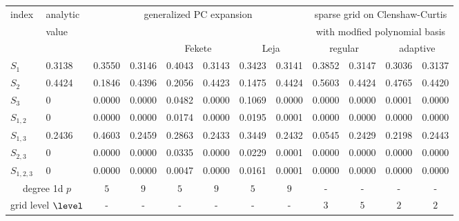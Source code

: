 
\begin{table}[!ht]
  \fontsize{8pt}{3ex}\selectfont
  \renewcommand{\arraystretch}{1.2}
  \begin{tabularx}{\textwidth}{XXXXXXXXXXXX}
    \toprule
    index &
    analytic &
    \multicolumn{6}{c}{generalized PC expansion} &
    \multicolumn{4}{c}{sparse grid on Clenshaw-Curtis} \\
    &
    value &
    & & & & & &
    \multicolumn{4}{c}{with modfied polynomial basis} \\
    \hline
    & &
    \multicolumn{2}{c}{\citet{Sudret08Global}} &
    \multicolumn{2}{c}{Fekete} &
    \multicolumn{2}{c}{Leja} &
    \multicolumn{2}{c}{regular} &
    \multicolumn{2}{c}{adaptive} \\
    \toprule
    $S_1$ & 0.3138 & 0.3550 & 0.3146 & 0.4043 & 0.3143 & 0.3423 & 0.3141 & 0.3852 & 0.3147 & 0.3036 & 0.3137 \\
    $S_2$ & 0.4424 & 0.1846 & 0.4396 & 0.2056 & 0.4423 & 0.1475 & 0.4424 & 0.5603 & 0.4424 & 0.4765 & 0.4420 \\
    $S_3$ & 0 & 0.0000 & 0.0000 & 0.0482 & 0.0000 & 0.1069 & 0.0000 & 0.0000 & 0.0000 & 0.0001 & 0.0000 \\
    $S_{1, 2}$ & 0 & 0.0000 & 0.0000 & 0.0174 & 0.0000 & 0.0195 & 0.0001 & 0.0000 & 0.0000 & 0.0000 & 0.0000 \\
    $S_{1, 3}$ & 0.2436 & 0.4603 & 0.2459 & 0.2863 & 0.2433 & 0.3449 & 0.2432 & 0.0545 & 0.2429 & 0.2198 & 0.2443 \\
    $S_{2, 3}$ & 0 & 0.0000 & 0.0000 & 0.0335 & 0.0000 & 0.0229 & 0.0001 & 0.0000 & 0.0000 & 0.0000 & 0.0000 \\
    $S_{1, 2, 3}$ & 0 & 0.0000 & 0.0000 & 0.0047 & 0.0000 & 0.0161 & 0.0001 & 0.0000 & 0.0000 & 0.0000 & 0.0000 \\
    \hline
    \multicolumn{2}{c}{degree 1d $p$} &
    \multicolumn{1}{c}{$5$} &
    \multicolumn{1}{c}{$9$} &
    \multicolumn{1}{c}{$5$} &
    \multicolumn{1}{c}{$9$} &
    \multicolumn{1}{c}{$5$} &
    \multicolumn{1}{c}{$9$} &
    \multicolumn{1}{c}{-} &
    \multicolumn{1}{c}{-} &
    \multicolumn{1}{c}{-} &
    \multicolumn{1}{c}{-} \\
    \multicolumn{2}{c}{grid level $\level$} &
    \multicolumn{1}{c}{-} &
    \multicolumn{1}{c}{-} &
    \multicolumn{1}{c}{-} &
    \multicolumn{1}{c}{-} &
    \multicolumn{1}{c}{-} &
    \multicolumn{1}{c}{-} &
    \multicolumn{1}{c}{$3$} &
    \multicolumn{1}{c}{$5$} &
    \multicolumn{1}{c}{$2$} &
    \multicolumn{1}{c}{$2$} \\

\end{tabularx}
\end{table}
